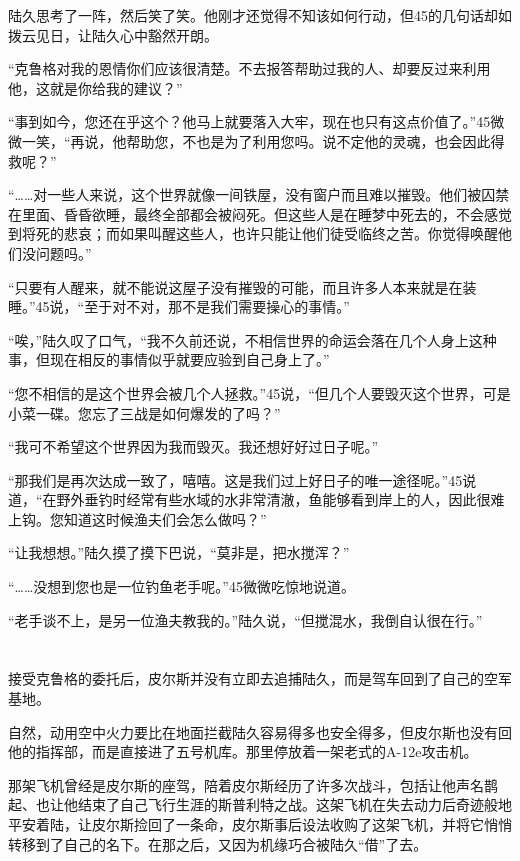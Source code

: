 陆久思考了一阵，然后笑了笑。他刚才还觉得不知该如何行动，但45的几句话却如拨云见日，让陆久心中豁然开朗。

“克鲁格对我的恩情你们应该很清楚。不去报答帮助过我的人、却要反过来利用他，这就是你给我的建议？”

“事到如今，您还在乎这个？他马上就要落入大牢，现在也只有这点价值了。”45微微一笑，“再说，他帮助您，不也是为了利用您吗。说不定他的灵魂，也会因此得救呢？”

“……对一些人来说，这个世界就像一间铁屋，没有窗户而且难以摧毁。他们被囚禁在里面、昏昏欲睡，最终全部都会被闷死。但这些人是在睡梦中死去的，不会感觉到将死的悲哀；而如果叫醒这些人，也许只能让他们徒受临终之苦。你觉得唤醒他们没问题吗。”

“只要有人醒来，就不能说这屋子没有摧毁的可能，而且许多人本来就是在装睡。”45说，“至于对不对，那不是我们需要操心的事情。”

“唉，”陆久叹了口气，“我不久前还说，不相信世界的命运会落在几个人身上这种事，但现在相反的事情似乎就要应验到自己身上了。”

“您不相信的是这个世界会被几个人拯救。”45说，“但几个人要毁灭这个世界，可是小菜一碟。您忘了三战是如何爆发的了吗？”

“我可不希望这个世界因为我而毁灭。我还想好好过日子呢。”

“那我们是再次达成一致了，嘻嘻。这是我们过上好日子的唯一途径呢。”45说道，“在野外垂钓时经常有些水域的水非常清澈，鱼能够看到岸上的人，因此很难上钩。您知道这时候渔夫们会怎么做吗？”

“让我想想。”陆久摸了摸下巴说，“莫非是，把水搅浑？”

“……没想到您也是一位钓鱼老手呢。”45微微吃惊地说道。

“老手谈不上，是另一位渔夫教我的。”陆久说，“但搅混水，我倒自认很在行。”

\section*{}

接受克鲁格的委托后，皮尔斯并没有立即去追捕陆久，而是驾车回到了自己的空军基地。

自然，动用空中火力要比在地面拦截陆久容易得多也安全得多，但皮尔斯也没有回他的指挥部，而是直接进了五号机库。那里停放着一架老式的A-12e攻击机。

那架飞机曾经是皮尔斯的座驾，陪着皮尔斯经历了许多次战斗，包括让他声名鹊起、也让他结束了自己飞行生涯的斯普利特之战。这架飞机在失去动力后奇迹般地平安着陆，让皮尔斯捡回了一条命，皮尔斯事后设法收购了这架飞机，并将它悄悄转移到了自己的名下。在那之后，又因为机缘巧合被陆久“借”了去。

